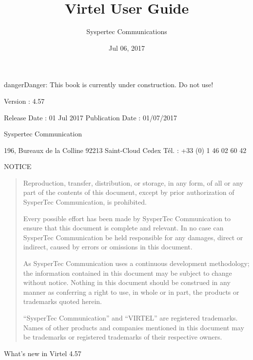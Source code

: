 \documentclass[letterpaper,10pt,english]{sphinxmanual}
\title{Virtel User Guide}
\date{Jul 06, 2017}
\author{Syspertec Communications}
\begin{document}
\maketitle
\sphinxtableofcontents
{}\label{\detokenize{User_Guide::doc}}




\begin{sphinxadmonition}{danger}{Danger:}
This book is currently under construction. Do not use!
\end{sphinxadmonition}

Version : 4.57

Release Date : 01 Jul 2017 Publication Date : 01/07/2017

Syspertec Communication

196, Bureaux de la Colline 92213 Saint-Cloud Cedex Tél. : +33 (0) 1 46 02 60 42


NOTICE
\begin{quote}

Reproduction, transfer, distribution, or storage, in any form, of all or any part of
the contents of this document, except by prior authorization of SysperTec
Communication, is prohibited.

Every possible effort has been made by SysperTec Communication to ensure that this document
is complete and relevant. In no case can SysperTec Communication be held responsible for
any damages, direct or indirect, caused by errors or omissions in this document.

As SysperTec Communication uses a continuous development methodology; the information
contained in this document may be subject to change without notice. Nothing in this
document should be construed in any manner as conferring a right to use, in whole or in
part, the products or trademarks quoted herein.

“SysperTec Communication” and “VIRTEL” are registered trademarks. Names of other products
and companies mentioned in this document may be trademarks or registered trademarks of
their respective owners.
\end{quote}

\newpage
{}\label{\detokenize{User_Guide:v457ug-introduction}}
What’s new in Virtel 4.57
\end{document}
